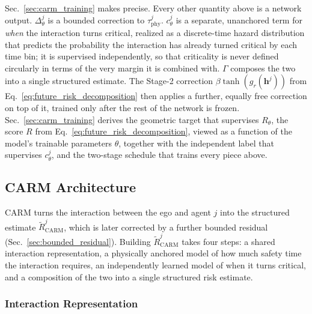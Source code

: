 \documentclass[letterpaper, 10 pt, conference]{ieeeconf}  %
\begin{document}
Sec.~\ref{sec:carm_training} makes precise. Every other quantity above is
a network output. $\Delta_{\theta}^{j}$ is a bounded correction to
$\tau_{\mathrm{phy}}^{j}$. $c_{\theta}^{j}$ is a separate, unanchored term
for \emph{when} the interaction turns critical, realized as a
discrete-time hazard distribution that predicts the probability the
interaction has already turned critical by each time bin; it is
supervised independently, so that criticality is never defined
circularly in terms of the very margin it is combined with. $\Gamma$
composes the two into a single structured estimate.
The Stage-2 correction $\beta\tanh(g_r(\bm h^{j}))$ from
Eq.~\eqref{eq:future_risk_decomposition} then applies a further, equally
free correction on top of it, trained only after the rest of the network
is frozen. Sec.~\ref{sec:carm_training} derives the geometric target that
supervises $R_\theta$, the score $R$ from
Eq.~\eqref{eq:future_risk_decomposition}, viewed as a function of the
model's trainable parameters $\theta$, together with the independent
label that supervises $c_\theta^{j}$, and the two-stage schedule that
trains every piece above.



\subsection{CARM Architecture}
\label{sec:CARM_Architecture}

CARM turns the interaction between the ego and agent $j$ into the
structured estimate $\widetilde R_{\mathrm{CARM}}^{j}$, which is later
corrected by a further bounded residual (Sec.~\ref{sec:bounded_residual}).
Building $\widetilde R_{\mathrm{CARM}}^{j}$ takes four steps: a shared
interaction representation, a physically anchored model of how much
safety time the interaction requires, an independently learned model of
when it turns critical, and a composition of the two into a single
structured risk estimate.

\subsubsection{Interaction Representation}
\end{document}
